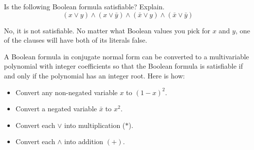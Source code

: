 \documentclass[12pt,answers]{exam}
\begin{document}
\begin{questions}

\question[8] Is the following Boolean formula satisfiable? Explain.
$$(x \vee y) \wedge (x \vee \bar{y}) \wedge (\bar{x} \vee y) \wedge (\bar{x} \vee \bar{y})$$
\begin{solution}
No, it is not satisfiable. No matter what Boolean values you pick for $x$ and $y$, one of the clauses will have both of its literals false.  
\end{solution}
\vfill


\question[16] A Boolean formula in conjugate normal form can be converted to a multivariable polynomial with integer coefficients so that the Boolean formula is satisfiable if and only if the polynomial has an integer root.  Here is how:
\begin{itemize}
\item Convert any non-negated variable $x$ to $(1-x)^2$.
\item Convert a negated variable $\bar{x}$ to $x^2$. 
\item Convert each $\vee$ into multiplication ($*$). 
\item Convert each $\wedge$ into addition $(+)$. 
\end{itemize}
\end{questions}
\end{document}
